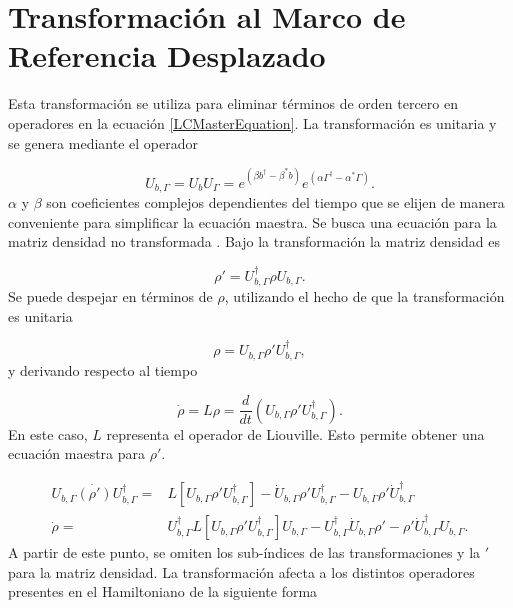 \documentclass[10pt,a4paper]{report}
\begin{document}
\chapter{Transformación al Marco de Referencia Desplazado}

Esta transformación se utiliza para eliminar términos de orden tercero en operadores en la ecuación \eqref{LCMasterEquation}. La transformación es unitaria y se genera mediante el operador

\begin{equation}
U_{b,\Gamma} =  U_b U_\Gamma = e^{(\beta b^\dagger - \beta^* b)}e^{(\alpha\Gamma^\dagger - \alpha^* \Gamma)}.
\end{equation} $\alpha$ y $\beta$ son coeficientes complejos dependientes del tiempo que se elijen de manera conveniente para simplificar la ecuación maestra. Se busca una ecuación para la matriz densidad no transformada \cite{TesisMaestria}. Bajo la transformación la matriz densidad es

\begin{equation}
\rho' = U_{b,\Gamma}^\dagger \rho U_{b,\Gamma}.
\end{equation} Se puede despejar en términos de $\rho$, utilizando el hecho de que la transformación es unitaria

\begin{equation}
\rho = U_{b,\Gamma} \rho' U_{b,\Gamma}^\dagger,
\end{equation}y derivando respecto al tiempo

\begin{equation}
\dot{\rho} = L\rho = \frac{d}{dt}(U_{b,\Gamma} \rho' U_{b,\Gamma}^\dagger).
\end{equation} En este caso, $L$ representa el operador de Liouville. Esto permite obtener una ecuación maestra para $\rho'$. 

\begin{align}
 U_{b,\Gamma} \dot{(\rho')} U_{b,\Gamma}^\dagger =& L[U_{b,\Gamma} \rho' U_{b,\Gamma}^\dagger] - \dot{U}_{b,\Gamma}\rho'U_{b,\Gamma}^\dagger -U_{b,\Gamma} \rho' \dot{U}_{b,\Gamma}^\dagger\\
\dot{\rho} =& U_{b,\Gamma}^\dagger L[U_{b,\Gamma} \rho' U_{b,\Gamma}^\dagger]U_{b,\Gamma}-U_{b,\Gamma}^\dagger\dot{U}_{b,\Gamma}\rho'-\rho'\dot{U}_{b,\Gamma}^\dagger U_{b,\Gamma}.
\end{align} A partir de este punto, se omiten los sub-índices de las transformaciones y la $'$ para la matriz densidad. La transformación afecta a los distintos operadores presentes en el Hamiltoniano de la siguiente forma
\end{document}
